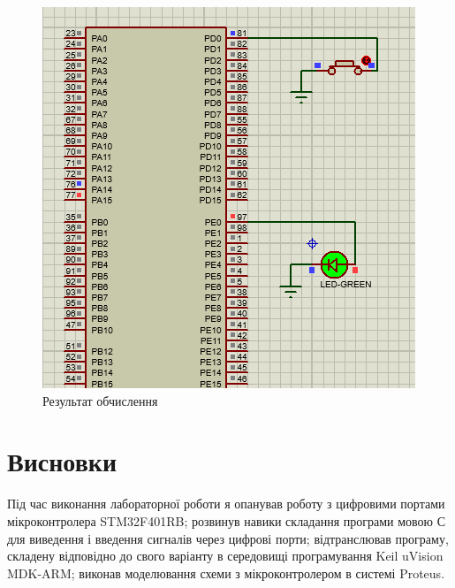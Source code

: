 \documentclass{article}
\begin{document}
\begin{normalsize}
\begin{lstlisting}
		\end{lstlisting}

\begin{figure}[H]
	\centering
	\includegraphics[scale=0.7]{1}
	\caption{Результат обчислення}
\end{figure}

			
		\section*{Висновки}
		Під час виконання лабораторної роботи я опанував роботу з цифровими портами мікроконтролера STM32F401RB; розвинув навики складання програми мовою С для виведення і введення сигналів через цифрові порти; відтранслював програму, складену відповідно до свого варіанту в середовищі програмування Keil uVision MDK-ARM; виконав моделювання схеми з мікроконтролером в системі Proteus.
		
	\end{normalsize}
\end{document}

